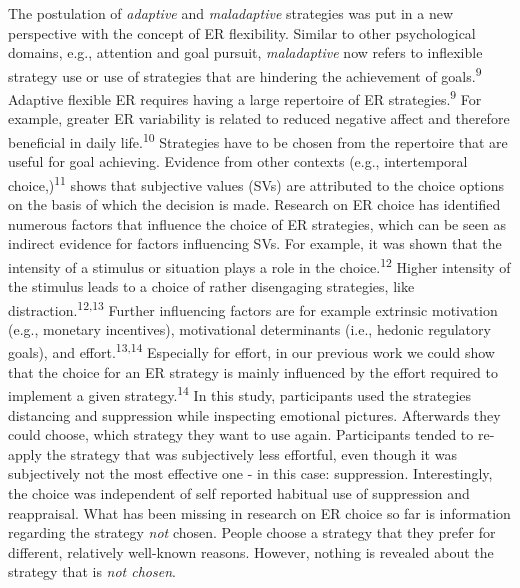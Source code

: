 \documentclass[
  english,
  man,floatsintext]{apa6}
\begin{document}
The postulation of \emph{adaptive} and \emph{maladaptive} strategies was put in a new perspective with the concept of ER flexibility.
Similar to other psychological domains, e.g., attention and goal pursuit, \emph{maladaptive} now refers to inflexible strategy use or use of strategies that are hindering the achievement of goals.\textsuperscript{9}
Adaptive flexible ER requires having a large repertoire of ER strategies.\textsuperscript{9}
For example, greater ER variability is related to reduced negative affect and therefore beneficial in daily life.\textsuperscript{10}
Strategies have to be chosen from the repertoire that are useful for goal achieving.
Evidence from other contexts (e.g., intertemporal choice,)\textsuperscript{11} shows that subjective values (SVs) are attributed to the choice options on the basis of which the decision is made.
Research on ER choice has identified numerous factors that influence the choice of ER strategies, which can be seen as indirect evidence for factors influencing SVs.
For example, it was shown that the intensity of a stimulus or situation plays a role in the choice.\textsuperscript{12}
Higher intensity of the stimulus leads to a choice of rather disengaging strategies, like distraction.\textsuperscript{12,13}
Further influencing factors are for example extrinsic motivation (e.g., monetary incentives), motivational determinants (i.e., hedonic regulatory goals), and effort.\textsuperscript{13,14}
Especially for effort, in our previous work we could show that the choice for an ER strategy is mainly influenced by the effort required to implement a given strategy.\textsuperscript{14}
In this study, participants used the strategies distancing and suppression while inspecting emotional pictures.
Afterwards they could choose, which strategy they want to use again.
Participants tended to re-apply the strategy that was subjectively less effortful, even though it was subjectively not the most effective one - in this case: suppression.
Interestingly, the choice was independent of self reported habitual use of suppression and reappraisal.
What has been missing in research on ER choice so far is information regarding the strategy \emph{not} chosen.
People choose a strategy that they prefer for different, relatively well-known reasons.
However, nothing is revealed about the strategy that is \emph{not chosen}.
\end{document}
